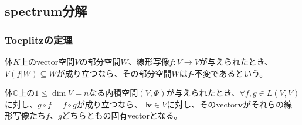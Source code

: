\documentclass[dvipdfmx]{jsarticle}
\begin{document}
\subsection{spectrum分解}%
\subsubsection{Toeplitzの定理}%
\begin{dfn*}
体$K$上のvector空間$V$の部分空間$W$、線形写像$f:V \rightarrow V$が与えられたとき、$V\left( f|W \right) \subseteq W$が成り立つなら、その部分空間$W$は$f$-不変であるという。
\end{dfn*}
\begin{thm}\label{2.3.9.1}
体$\mathbb{C}$上の$1 \leq \dim V = n$なる内積空間$(V,\varPhi)$が与えられたとき、$\forall f,g \in L(V,V)$に対し、$g \circ f = f \circ g$が成り立つなら、$\exists\mathbf{v} \in V$に対し、そのvector$\mathbf{v}$がそれらの線形写像たち$f$、$g$どちらともの固有vectorとなる。
\end{thm}
\end{document}
